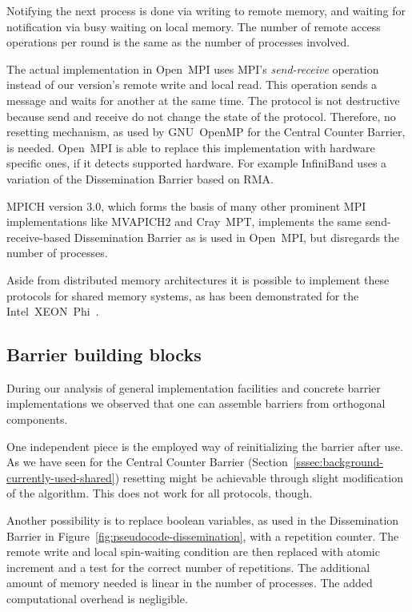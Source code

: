 \documentclass[a4paper, 10pt]{article}
\begin{document}
Notifying the next process is done via writing to remote memory, and waiting for notification via busy waiting on local memory. The number of remote access operations per round is the same as the number of processes involved.

The actual implementation in Open~MPI uses MPI's \emph{send-receive} operation instead of our version's remote write and local read. This operation sends a message and waits for another at the same time. The protocol is not destructive because send and receive do not change the state of the protocol. Therefore, no resetting mechanism, as used by GNU~OpenMP for the Central Counter Barrier, is needed.
Open~MPI is able to replace this implementation with hardware specific ones, if it detects supported hardware. For example InfiniBand uses a variation of the Dissemination Barrier based on RMA\cite{hoefler2006a}.

MPICH version 3.0, which forms the basis of many other prominent MPI implementations like MVAPICH2 and Cray~MPT, implements the same send-receive-based Dissemination Barrier as is used in Open~MPI, but disregards the number of processes.

Aside from distributed memory architectures it is possible to implement these protocols for shared memory systems, as has been demonstrated for the Intel~XEON~Phi~\cite{hoefler2013}.

\subsection{Barrier building blocks}
\label{ssec:background-building-blocks}
During our analysis of general implementation facilities and concrete barrier implementations we observed that one can assemble barriers from orthogonal components.

One independent piece is the employed way of reinitializing the barrier after use. As we have seen for the Central Counter Barrier (Section~\ref{sssec:background-currently-used-shared}) resetting might be achievable through slight modification of the algorithm. This does not work for all protocols, though.

Another possibility is to replace boolean variables, as used in the Dissemination Barrier in Figure~\ref{fig:pseudocode-dissemination}, with a repetition counter. The remote write and local spin-waiting condition are then replaced with atomic increment and a test for the correct number of repetitions. The additional amount of memory needed is linear in the number of processes. The added computational overhead is negligible.
\end{document}
